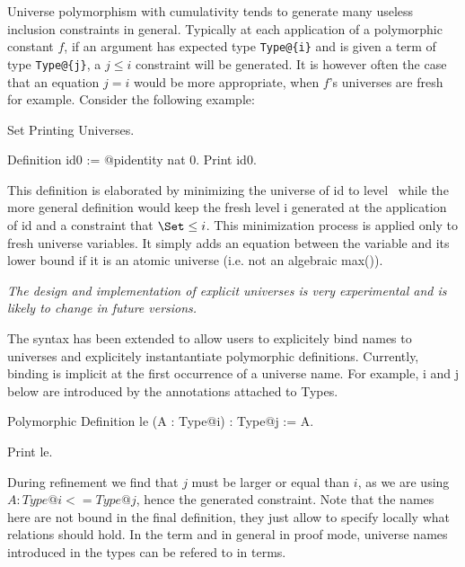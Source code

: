 
Universe polymorphism with cumulativity tends to generate many useless
inclusion constraints in general. Typically at each application of a
polymorphic constant $f$, if an argument has expected type
\verb|Type@{i}| and is given a term of type \verb|Type@{j}|, a $j \le i$
constraint will be generated. It is however often the case that an
equation $j = i$ would be more appropriate, when $f$'s
universes are fresh for example. Consider the following example:

\begin{coq_eval}
Set Printing Universes.
\end{coq_eval}
\begin{coq_example}
Definition id0 := @pidentity nat 0.
Print id0.
\end{coq_example}

This definition is elaborated by minimizing the universe of id to level
\Set~while the more general definition would keep the fresh level i
generated at the application of id and a constraint that $\Set \le i$.
This minimization process is applied only to fresh universe
variables. It simply adds an equation between the variable and its lower
bound if it is an atomic universe (i.e. not an algebraic max()).


\begin{flushleft}
  \em The design and implementation of explicit universes is very
  experimental and is likely to change in future versions.
\end{flushleft}

The syntax has been extended to allow users to explicitely bind names to
universes and explicitely instantantiate polymorphic
definitions. Currently, binding is implicit at the first occurrence of a 
universe name. For example, i and j below are introduced by the
annotations attached to Types. 

\begin{coq_example*}
Polymorphic Definition le (A : Type@{i}) : Type@{j} := A.
\end{coq_example*}
\begin{coq_example}
Print le.
\end{coq_example}

During refinement we find that $j$ must be larger or equal than $i$, as
we are using $A : Type@{i} <= Type@{j}$, hence the generated
constraint. Note that the names here are not bound in the final
definition, they just allow to specify locally what relations should
hold. In the term and in general in proof mode, universe names
introduced in the types can be refered to in terms.

